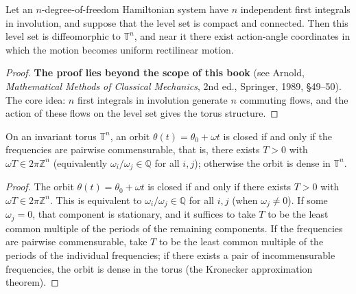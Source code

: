 \begin{theorem}\label{thm:liouville_arnold}
Let an $n$-degree-of-freedom Hamiltonian system have $n$ independent first integrals in involution, and suppose that the level set is compact and connected. Then this level set is diffeomorphic to $\mathbb{T}^n$, and near it there exist action-angle coordinates in which the motion becomes uniform rectilinear motion.
\end{theorem}

\begin{proof}
\textbf{The proof lies beyond the scope of this book} (see Arnold, \textit{Mathematical Methods of Classical Mechanics}, 2nd ed., Springer, 1989, \S{}49--50). The core idea: $n$ first integrals in involution generate $n$ commuting flows, and the action of these flows on the level set gives the torus structure.
\end{proof}

\begin{corollary}\label{cor:torus_closure_criterion}
On an invariant torus $\mathbb{T}^n$, an orbit $\theta(t)=\theta_0+\omega t$ is closed if and only if the frequencies are pairwise commensurable, that is, there exists $T>0$ with $\omega T\in2\pi\mathbb{Z}^n$ (equivalently $\omega_i/\omega_j\in\mathbb{Q}$ for all $i,j$); otherwise the orbit is dense in $\mathbb{T}^n$.
\end{corollary}

\begin{proof}
The orbit $\theta(t) = \theta_0 + \omega t$ is closed if and only if there exists $T > 0$ with $\omega T \in 2\pi\mathbb{Z}^n$. This is equivalent to $\omega_i / \omega_j \in \mathbb{Q}$ for all $i,j$ (when $\omega_j \neq 0$). If some $\omega_j=0$, that component is stationary, and it suffices to take $T$ to be the least common multiple of the periods of the remaining components. If the frequencies are pairwise commensurable, take $T$ to be the least common multiple of the periods of the individual frequencies; if there exists a pair of incommensurable frequencies, the orbit is dense in the torus (the Kronecker approximation theorem).
\end{proof}

